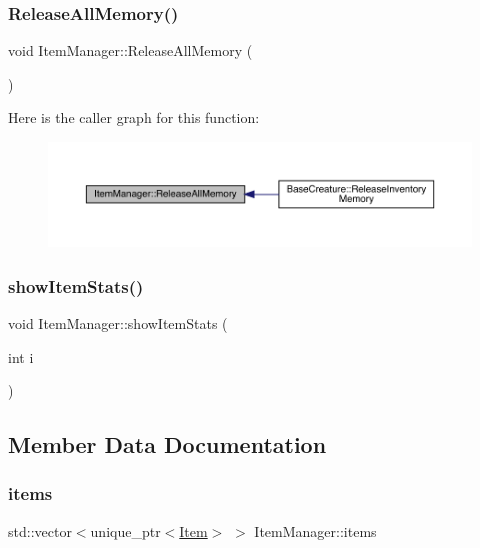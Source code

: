 \subsubsection{\texorpdfstring{Release\+All\+Memory()}{ReleaseAllMemory()}}
{\footnotesize\ttfamily void Item\+Manager\+::\+Release\+All\+Memory (\begin{DoxyParamCaption}{ }\end{DoxyParamCaption})}

Here is the caller graph for this function\+:
\nopagebreak
\begin{figure}[H]
\begin{center}
\leavevmode
\includegraphics[width=350pt]{dc/de1/class_item_manager_a70bf322ab676e3eb16850ddbcdf601d5_icgraph}
\end{center}
\end{figure}
\mbox{\label{class_item_manager_a865c3d2863ca55df09728514e4f6cd6d}} 
\subsubsection{\texorpdfstring{show\+Item\+Stats()}{showItemStats()}}
{\footnotesize\ttfamily void Item\+Manager\+::show\+Item\+Stats (\begin{DoxyParamCaption}\item[{int}]{i }\end{DoxyParamCaption})}



\subsection{Member Data Documentation}
\mbox{\label{class_item_manager_a67bf78a9baf31874b6cd6309e0d86e1e}} 
\subsubsection{\texorpdfstring{items}{items}}
{\footnotesize\ttfamily std\+::vector$<$unique\+\_\+ptr$<$\mbox{\hyperlink{class_item}{Item}}$>$ $>$ Item\+Manager\+::items\hspace{0.3cm}{\ttfamily [private]}}




